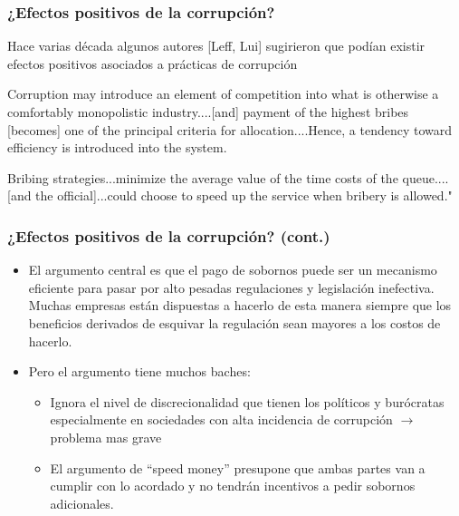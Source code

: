 \documentclass[handout,final,xcolor=dvipsnames]{beamer}
\begin{document}
\begin{frame}\frametitle{¿Efectos positivos de la corrupción?}
Hace varias década algunos autores [Leff, Lui] sugirieron que podían
existir efectos positivos asociados a prácticas de corrupción \smallskip

\begin{block}{}
Corruption may introduce an element of competition into what is otherwise a comfortably monopolistic
industry....[and] payment of the highest bribes [becomes] one of the principal criteria for
allocation....Hence, a tendency toward efficiency is introduced into the system.
\end{block}
\smallskip 
\begin{block}{}
Bribing strategies...minimize the average value of the time costs of the queue....[and the
official]...could choose to speed up the service when bribery is allowed."
\end{block}
\end{frame}


\begin{frame}\frametitle{¿Efectos positivos de la corrupción? (cont.)}
\begin{itemize}\itemsep 10pt
\item El argumento central es que el pago de sobornos puede ser un
  mecanismo eficiente para pasar por alto pesadas regulaciones y
  legislación inefectiva. Muchas empresas están dispuestas a hacerlo
  de esta manera siempre que los beneficios derivados de esquivar la
  regulación sean mayores a los costos de hacerlo. 
\item Pero el argumento tiene muchos baches:
\begin{itemize}\itemsep 10pt
\item Ignora el nivel de discrecionalidad que tienen los políticos y
  burócratas especialmente en sociedades con alta incidencia de
  corrupción $\longrightarrow$ problema mas grave
\item El argumento de ``speed money'' presupone que ambas partes van a
  cumplir con lo acordado y no tendrán incentivos a pedir sobornos
  adicionales. 
\end{itemize}
\end{itemize}
\end{frame}
\end{document}
